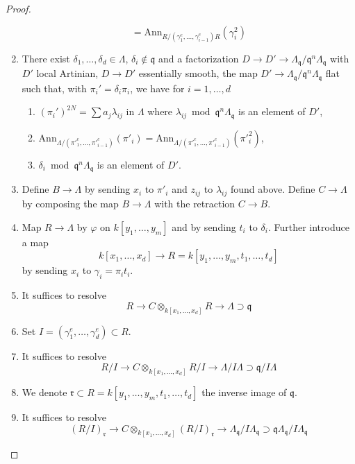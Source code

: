 \begin{proof}
\begin{enumerate}
$$=
\text{Ann}_{R/(\gamma_1^e, \ldots, \gamma_{i - 1}^e)R}(\gamma_i^2)
$$
\item
\label{item-choose-deltai}
There exist $\delta_1, \ldots, \delta_d \in \Lambda$,
$\delta_i \not \in \mathfrak q$ and a factorization
$D \to D' \to \Lambda_\mathfrak q/\mathfrak q^n\Lambda_\mathfrak q$
with $D'$ local Artinian, $D \to D'$ essentially smooth, the map
$D' \to \Lambda_\mathfrak q/\mathfrak q^n\Lambda_\mathfrak q$
flat such that, with $\pi_i' = \delta_i \pi_i$, we have for
$i = 1, \ldots, d$
\begin{enumerate}
\item $(\pi_i')^{2N} = \sum a_j\lambda_{ij}$ in $\Lambda$ where
$\lambda_{ij} \bmod \mathfrak q^n\Lambda_\mathfrak q$ is an element of $D'$,
\item $\text{Ann}_{\Lambda/({\pi'}_1^e, \ldots, {\pi'}_{i - 1}^e)}({\pi'}_i) =
\text{Ann}_{\Lambda/({\pi'}_1^e, \ldots, {\pi'}_{i - 1}^e)}({\pi'}_i^2)$,
\item $\delta_i \bmod \mathfrak q^n\Lambda_\mathfrak q$ is an element of $D'$.
\end{enumerate}
\item
\label{item-map-B-Lambda}
Define $B \to \Lambda$ by sending $x_i$ to $\pi'_i$ and
$z_{ij}$ to $\lambda_{ij}$ found above. Define $C \to \Lambda$
by composing the map $B \to \Lambda$ with the retraction $C \to B$.
\item
\label{item-set-map-R}
Map $R \to \Lambda$ by $\varphi$ on $k[y_1, \ldots, y_m]$
and by sending $t_i$ to $\delta_i$. Further introduce a map
$$
k[x_1, \ldots, x_d]
\longrightarrow
R = k[y_1, \ldots, y_m, t_1, \ldots, t_d]
$$
by sending $x_i$ to $\gamma_i = \pi_i t_i$.
\item
\label{item-first-solve}
It suffices to resolve
$$
R
\to
C \otimes_{k[x_1, \ldots, x_d]} R
\to
\Lambda \supset \mathfrak q
$$
\item
\label{item-set-I}
Set $I = (\gamma_1^e, \ldots, \gamma_d^e) \subset R$.
\item
\label{item-second-resolve}
It suffices to resolve
$$
R/I
\to
C \otimes_{k[x_1, \ldots, x_d]} R/I
\to
\Lambda/I\Lambda \supset \mathfrak q/I\Lambda
$$
\item
\label{item-set-r}
We denote $\mathfrak r \subset R = k[y_1, \ldots, y_m, t_1, \ldots, t_d]$
the inverse image of $\mathfrak q$.
\item
\label{item-third-resolve}
It suffices to resolve
$$
(R/I)_\mathfrak r \to
C \otimes_{k[x_1, \ldots, x_d]} (R/I)_\mathfrak r \to
\Lambda_\mathfrak q/I\Lambda_\mathfrak q
\supset
\mathfrak q\Lambda_\mathfrak q/I\Lambda_\mathfrak q
$$
\end{enumerate}
\end{proof}
